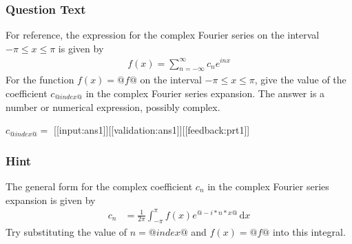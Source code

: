 \documentclass[a4paper,10pt]{article}
\begin{document}
\subsubsection{Question Text}
For reference, the expression for the complex Fourier series on the interval $-\pi \leq x \leq \pi$ is given by \begin{align*}
f(x) = \sum_{n=-\infty}^{\infty}c_ne^{inx}
\end{align*}
For the function \(f(x) = @f@\) on the interval \(-\pi \leq x \leq \pi\), give the value of the coefficient \(c_{@index@}\) in the complex Fourier series expansion. The answer is a number or numerical expression, possibly complex.

\(c_{@index@} = \) [[input:ans1]][[validation:ans1]][[feedback:prt1]]
\subsubsection{Hint}
The general form for the complex coefficient \(c_n\) in the complex Fourier series expansion is given by \begin{align*} c_{n} &= \frac{1}{2\pi} \int_{-\pi}^{\pi} f(x)e^{@-i*n*x@} \, \text{d}x \end{align*}
Try substituting the value of $n=@index@$ and $f(x)=@f@$ into this integral.
\end{document}
